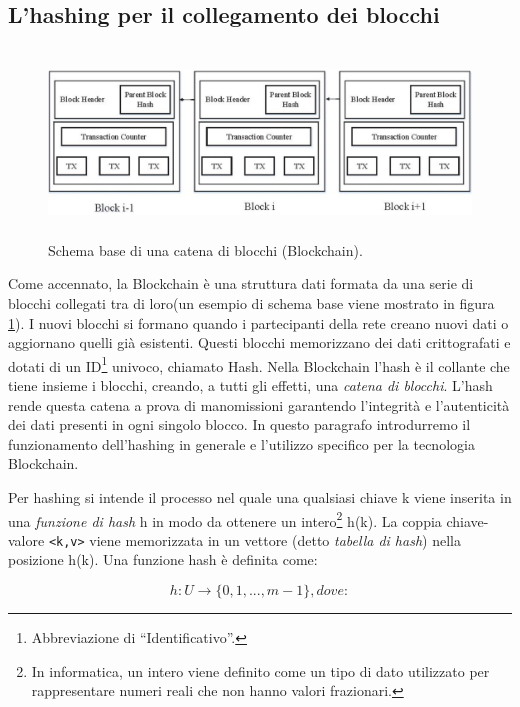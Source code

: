 \subsection{L'hashing per il collegamento dei blocchi} \label{hashing}
\begin{figure}[h]
    \centering
    \includegraphics[width=12.5cm,height=5cm]{Immagini/Catena.png}
    \caption[Schema base di una catena di blocchi]{Schema base di una catena di blocchi (Blockchain).}
    \label{catena}
\end{figure}
Come accennato, la Blockchain è una struttura dati formata da una serie di blocchi collegati tra di loro(un esempio di schema base viene mostrato in figura \ref{catena}).
I nuovi blocchi si formano quando i partecipanti della rete creano nuovi dati o aggiornano quelli già esistenti. Questi blocchi memorizzano dei dati crittografati e dotati di un ID\footnote{Abbreviazione di “Identificativo”.} univoco, chiamato Hash.
Nella Blockchain l’hash è il collante che tiene insieme i blocchi, creando, a tutti gli effetti, una \textit{catena di blocchi}. L'hash rende questa catena a prova di manomissioni garantendo l'integrità e l'autenticità dei dati presenti in ogni singolo blocco. In questo paragrafo introdurremo il funzionamento dell'hashing in generale e l'utilizzo specifico per la tecnologia Blockchain.

Per hashing si intende il processo nel quale una qualsiasi chiave k viene inserita in una \textit{funzione di hash} h in modo da ottenere un intero\footnote{In informatica, un intero viene definito come un tipo di dato utilizzato per rappresentare numeri reali che non hanno valori frazionari.} h(k). La coppia chiave-valore \lstinline|<k,v>| viene memorizzata in un vettore (detto \textit{tabella di hash}) nella posizione h(k).
Una funzione hash è definita come:

\begin{equation*}
    h:U \rightarrow  \{0,1,...,m-1\} , dove:
\end{equation*}

